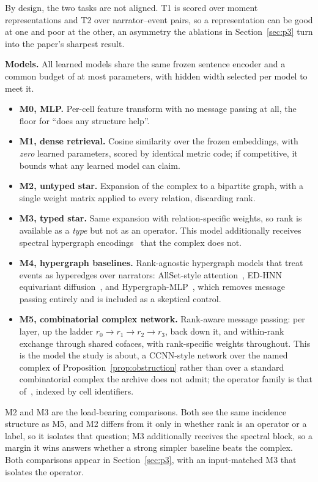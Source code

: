 \documentclass[conference]{IEEEtran}
\begin{document}
By design, the two tasks are not aligned. T1 is scored over moment representations and T2
over narrator--event pairs, so a representation can be good at one and poor at the other, an
asymmetry the ablations in Section~\ref{sec:p3} turn into the paper's sharpest result.

\textbf{Models.} All learned models share the same frozen sentence encoder and a common
budget of at most \paramBudget{} parameters, with hidden width selected per model to meet it.

\begin{itemize}[leftmargin=1.2em,itemsep=1pt,topsep=2pt]
\item \textbf{M0, MLP.} Per-cell feature transform with no message passing at all, the floor
for ``does any structure help''.
\item \textbf{M1, dense retrieval.} Cosine similarity over the frozen embeddings, with
\emph{zero} learned parameters, scored by identical metric code; if competitive, it bounds
what any learned model can claim.
\item \textbf{M2, untyped star.} Expansion of the complex to a bipartite graph, with a single
weight matrix applied to every relation, discarding rank.
\item \textbf{M3, typed star.} Same expansion with relation-specific weights, so rank is
available as a \emph{type} but not as an operator. This model additionally receives spectral
hypergraph encodings~\citep{zhou2006hypergraph} that the complex does not.
\item \textbf{M4, hypergraph baselines.} Rank-agnostic hypergraph models that treat events
as hyperedges over narrators: AllSet-style attention~\citep{chien2022allset}, ED-HNN
equivariant diffusion~\citep{wang2023edhnn}, and Hypergraph-MLP~\citep{tang2024hypergraphmlp},
which removes message passing entirely and is included as a skeptical control.
\item \textbf{M5, combinatorial complex network.} Rank-aware message passing: per layer, up
the ladder $r_0 \to r_1 \to r_2 \to r_3$, back down it, and within-rank exchange through
shared cofaces, with rank-specific weights throughout. This is
the model the study is about, a CCNN-style network over the named complex of
Proposition~\ref{prop:obstruction} rather than over a standard combinatorial complex the
archive does not admit; the operator family is that of~\citet{hajij2023tdl},
indexed by cell identifiers.
\end{itemize}

M2 and M3 are the load-bearing comparisons. Both see the
same incidence structure as M5, and M2 differs from it only in whether rank is an operator or
a label, so it isolates that question; M3 additionally receives the spectral
block, so
a margin it wins answers whether a strong simpler
baseline beats the complex. Both comparisons appear in Section~\ref{sec:p3}, with an
input-matched M3 that isolates the operator.
\end{document}
